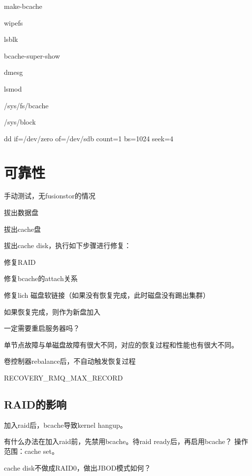 \begin{enumbox}
\item make-bcache
\item wipefs
\item lsblk
\item bcache-super-show
\item dmesg
\item lsmod
\item /sys/fs/bcache
\item /sys/block
\item dd if=/dev/zero of=/dev/sdb count=1 bs=1024 seek=4
\end{enumbox}

\section{可靠性}

手动测试，无fusionstor的情况
\begin{enumbox}
\item 拔出数据盘
\item 拔出cache盘
\end{enumbox}

拔出cache disk，执行如下步骤进行修复：
\begin{enumbox}
\item 修复RAID
\item 修复bcache的attach关系
\item 修复lich 磁盘软链接（如果没有恢复完成，此时磁盘没有踢出集群）
\item 如果恢复完成，则作为新盘加入
\end{enumbox}

一定需要重启服务器吗？

单节点故障与单磁盘故障有很大不同，对应的恢复过程和性能也有很大不同。

卷控制器rebalance后，不自动触发恢复过程

RECOVERY\_RMQ\_MAX\_RECORD

\subsection{RAID的影响}


加入raid后，bcache导致kernel hangup。

有什么办法在加入raid前，先禁用bcache。待raid ready后，再启用bcache？
操作范围：cache set。

cache disk不做成RAID0，做出JBOD模式如何？

